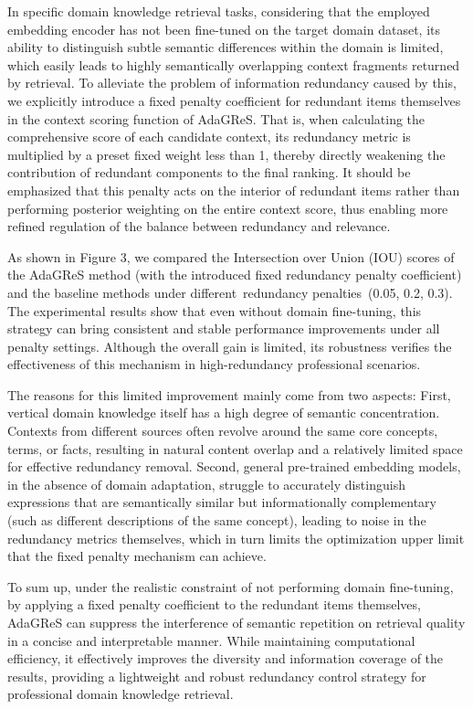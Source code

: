 \documentclass[11pt]{article}
\begin{document}
In specific domain knowledge retrieval tasks, considering that the employed embedding encoder has not been fine-tuned on the target domain dataset, its ability to distinguish subtle semantic differences within the domain is limited, which easily leads to highly semantically overlapping context fragments returned by retrieval. To alleviate the problem of information redundancy caused by this, we explicitly introduce a fixed penalty coefficient for redundant items themselves in the context scoring function of AdaGReS. That is, when calculating the comprehensive score of each candidate context, its redundancy metric is multiplied by a preset fixed weight less than 1, thereby directly weakening the contribution of redundant components to the final ranking. It should be emphasized that this penalty acts on the interior of redundant items rather than performing posterior weighting on the entire context score, thus enabling more refined regulation of the balance between redundancy and relevance.

As shown in Figure 3, we compared the Intersection over Union (IOU) scores of the AdaGReS method (with the introduced fixed redundancy penalty coefficient) and the baseline methods under different redundancy penalties (0.05, 0.2, 0.3). The experimental results show that even without domain fine-tuning, this strategy can bring consistent and stable performance improvements under all penalty settings. Although the overall gain is limited, its robustness verifies the effectiveness of this mechanism in high-redundancy professional scenarios.

The reasons for this limited improvement mainly come from two aspects: First, vertical domain knowledge itself has a high degree of semantic concentration. Contexts from different sources often revolve around the same core concepts, terms, or facts, resulting in natural content overlap and a relatively limited space for effective redundancy removal. Second, general pre-trained embedding models, in the absence of domain adaptation, struggle to accurately distinguish expressions that are semantically similar but informationally complementary (such as different descriptions of the same concept), leading to noise in the redundancy metrics themselves, which in turn limits the optimization upper limit that the fixed penalty mechanism can achieve.

To sum up, under the realistic constraint of not performing domain fine-tuning, by applying a fixed penalty coefficient to the redundant items themselves, AdaGReS can suppress the interference of semantic repetition on retrieval quality in a concise and interpretable manner. While maintaining computational efficiency, it effectively improves the diversity and information coverage of the results, providing a lightweight and robust redundancy control strategy for professional domain knowledge retrieval.
\end{document}
